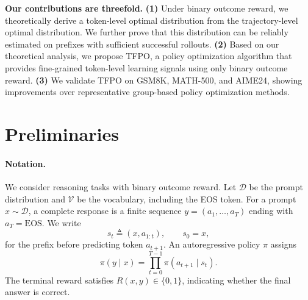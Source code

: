 \documentclass{article}
\begin{document}
\noindent \textbf{Our contributions are threefold.}
\textbf{(1)} Under binary outcome reward, we theoretically derive a token-level optimal distribution from the trajectory-level optimal distribution.
We further prove that this distribution can be reliably estimated on prefixes with sufficient successful rollouts.
\textbf{(2)} Based on our theoretical analysis, we propose TFPO, a policy optimization algorithm that provides fine-grained token-level learning signals using only binary outcome reward. 
\textbf{(3)} We validate TFPO on GSM8K, MATH-500, and AIME24, showing improvements over representative group-based policy optimization methods.


\section{Preliminaries}
\label{sec:preliminaries}

\paragraph{Notation.}
We consider reasoning tasks with binary outcome reward.  Let $\mathcal{D}$ be the prompt distribution and $\mathcal{V}$ be the vocabulary, including the EOS token.  For a prompt $x\sim\mathcal{D}$, a complete response is a finite sequence $y=(a_1,\ldots,a_T)$ ending with $a_T=\mathrm{EOS}$.  We write
\begin{equation}
    s_t \triangleq (x,a_{1:t}), \qquad s_0=x,
\end{equation}
for the prefix before predicting token $a_{t+1}$.  An autoregressive policy $\pi$ assigns
\begin{equation}
    \pi(y\mid x)=\prod_{t=0}^{T-1}\pi(a_{t+1}\mid s_t).
\end{equation}
The terminal reward satisfies $R(x,y)\in\{0,1\}$, indicating whether the final answer is correct.
\end{document}
